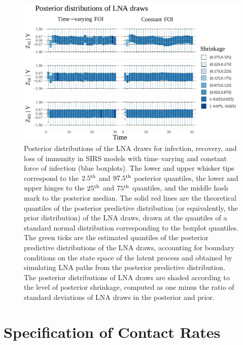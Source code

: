 \begin{figure}[htbp]
	\centering
	\includegraphics[width=\linewidth]{figures/sinfoi_lna_drawplots}
	\caption[Posterior distributions of LNA draws for SIRS models with time--varying and constant force of infection.]{Posterior distributions of the LNA draws for infection, recovery, and loss of immunity in SIRS models with time--varying and constant force of infection (blue boxplots). The lower and upper whisker tips correspond to the $ 2.5^{\mathrm{th}} $ and $ 97.5^{\mathrm{th}} $ posterior quantiles, the lower and upper hinges to the $ 25^{\mathrm{th}} $ and $ 75^{\mathrm{th}} $ quantiles, and the middle hash mark to the posterior median. The solid red lines are the theoretical quantiles of the posterior predictive distribution (or equivalently, the prior distribution) of the LNA draws, drawn at the quantiles of a standard normal distribution corresponding to the boxplot quantiles. The green ticks are the estimated quantiles of the posterior predictive distributions of the LNA draws, accounting for boundary conditions on the state space of the latent process and obtained by simulating LNA paths from the posterior predictive distribution. The posterior distributions of LNA draws are shaded according to the level of posterior shrinkage, computed as one minus the ratio of standard deviations of LNA draws in the posterior and prior.}
	\label{fig:sinfoidrawplots}
\end{figure}

\newpage
\section{Specification of Contact Rates}
\label{sec:flu_contact_rates}

